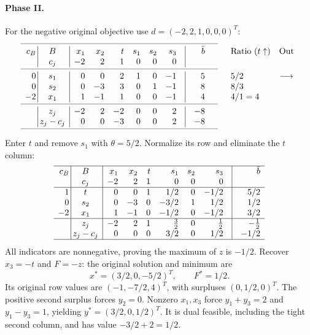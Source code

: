 \documentclass[11pt,a4paper]{article}
\begin{document}
\paragraph{Phase II.}
For the negative original objective use $d=(-2,2,1,0,0,0)^T$:
\[
  \begin{array}{r@{\hspace{0.2em}}|@{\hspace{0.2em}}c@{\enspace}|@{\enspace}rrrrrr@{\quad}|@{\quad}r@{\qquad\quad}l@{\quad}c}\cmidrule(r{1.5em}){1-9}
    c_B & B & x_1 & x_2 & t & s_1 & s_2 & s_3 & \bar b & \text{Ratio }(t\uparrow) & \text{Out}\\
    & c_j & -2 & 2 & 1 & 0 & 0 & 0 & & & \\
    \cmidrule(r{1.5em}){1-9}
    0 & s_1 & 0 & 0 & 2 & 1 & 0 & -1 & 5 & 5 / 2 & \longrightarrow\\
    0 & s_2 & 0 & -3 & 3 & 0 & 1 & -1 & 8 & 8 / 3 & \\
    -2 & x_1 & 1 & -1 & 1 & 0 & 0 & -1 & 4 & 4 / 1=4 & \\
    \cmidrule(r{1.5em}){1-9}
    & z_j & -2 & 2 & -2 & 0 & 0 & 2 & -8 & & \\
    & z_j-c_j & 0 & 0 & -3 & 0 & 0 & 2 & -8 & & \\
    \cmidrule(r{1.5em}){1-9}
  \end{array}
\]
Enter $t$ and remove $s_1$ with $\theta=5/2$. Normalize its row and eliminate the $t$ column:
\[
  \begin{array}{r@{\hspace{0.2em}}|@{\hspace{0.2em}}c@{\enspace}|@{\enspace}rrrrrr@{\quad}|@{\quad}r}\hline
    c_B & B & x_1 & x_2 & t & s_1 & s_2 & s_3 & \bar b\\
    & c_j & -2 & 2 & 1 & 0 & 0 & 0 & \\
    \hline
    1 & t & 0 & 0 & 1 & 1/2 & 0 & -1/2 & 5/2\\
    0 & s_2 & 0 & -3 & 0 & -3/2 & 1 & 1/2 & 1/2\\
    -2 & x_1 & 1 & -1 & 0 & -1/2 & 0 & -1/2 & 3/2\\
    \hline
    & z_j & -2 & 2 & 1 & \tfrac{3}{2} & 0 & \tfrac{1}{2} & -\tfrac{1}{2}\\
    & z_j-c_j & 0 & 0 & 0 & 3/2 & 0 & 1/2 & -1/2\\
    \hline
  \end{array}
\]
All indicators are nonnegative, proving the maximum of $z$ is $-1/2$.
Recover $x_3=-t$ and $F=-z$: the original solution and minimum are
\[
  x^*=(3/2,0,-5/2)^T,\qquad F^*=1/2.
\]
Its original row values are $(-1,-7/2,4)^T$, with surpluses $(0,1/2,0)^T$.
The positive second surplus forces $y_2=0$. Nonzero $x_1,x_3$ force
$y_1+y_3=2$ and $y_1-y_3=1$, yielding $y^*=(3/2,0,1/2)^T$.
It is dual feasible, including the tight second column, and has value
$-3/2+2=1/2$.
\end{document}
